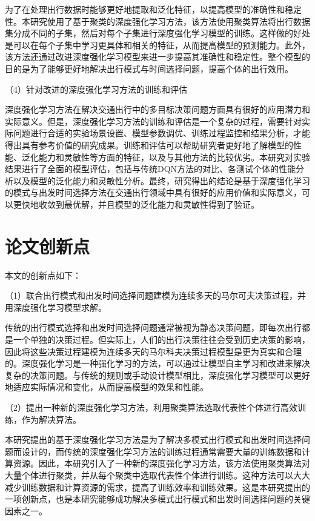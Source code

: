 为了在处理出行数据时能够更好地提取和泛化特征，以提高模型的准确性和稳定性。本研究使用了基于聚类的深度强化学习方法，该方法使用聚类算法将出行数据集分成不同的子集，然后对每个子集进行深度强化学习模型的训练。这样做的好处是可以在每个子集中学习更具体和相关的特征，从而提高模型的预测能力。此外，该方法还通过改进深度强化学习模型来进一步提高其准确性和稳定性。整个模型的目的是为了能够更好地解决出行模式与时间选择问题，提高个体的出行效用。

（4）针对改进的深度强化学习方法的训练和评估

深度强化学习方法在解决交通出行中的多目标决策问题方面具有很好的应用潜力和实际意义。但是，深度强化学习方法的训练和评估是一个复杂的过程，需要针对实际问题进行合适的实验场景设置、模型参数调优、训练过程监控和结果分析，才能得出具有参考价值的研究成果。训练和评估可以帮助研究者更好地了解模型的性能、泛化能力和灵敏性等方面的特征，以及与其他方法的比较优劣。本研究对实验结果进行了全面的模型评估，包括与传统DQN方法的对比、各测试个体的性能分析以及模型的泛化能力和灵敏性分析。最终，研究得出的结论是基于深度强化学习的模式与出发时间选择方法在交通出行领域中具有很好的应用价值和实际意义，可以更快地收敛到最优解，并且模型的泛化能力和灵敏性得到了验证。


\section{论文创新点}

本文的创新点如下：

（1）联合出行模式和出发时间选择问题建模为连续多天的马尔可夫决策过程，并用深度强化学习模型求解。

传统的出行模式选择和出发时间选择问题通常被视为静态决策问题，即每次出行都是一个单独的决策过程。但实际上，人们的出行决策往往会受到历史决策的影响，因此将这些决策过程建模为连续多天的马尔科夫决策过程模型是更为真实和合理的。深度强化学习是一种强化学习的方法，可以通过让模型自主学习和改进来解决复杂的决策问题。与传统的规则或手动设计模型相比，深度强化学习模型可以更好地适应实际情况和变化，从而提高模型的效果和性能。

（2）提出一种新的深度强化学习方法，利用聚类算法选取代表性个体进行高效训练，作为解决算法。

本研究提出的基于深度强化学习方法是为了解决多模式出行模式和出发时间选择问题而设计的，而传统的深度强化学习方法的训练过程通常需要大量的训练数据和计算资源。因此，本研究引入了一种新的深度强化学习方法，该方法使用聚类算法对大量个体进行聚类，并从每个聚类中选取代表性个体进行训练。这种方法可以大大减少训练数据和计算资源的需求，提高了训练效率和训练效果。这是本研究提出的一项创新点，也是本研究能够成功解决多模式出行模式和出发时间选择问题的关键因素之一。

